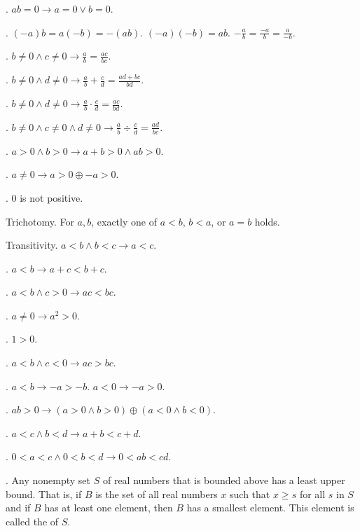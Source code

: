 \documentclass{slnotes}
\begin{document}
. \(ab = 0 \to a = 0 \lor b = 0\).

. \((-a)b = a(-b) = -(ab)\). \((-a)(-b) = ab\). \(-\frac{a}{b} = \frac{-a}{b} = \frac{a}{-b}\).

. \(b \neq 0 \land c \neq 0 \to \frac{a}{b} = \frac{ac}{bc}\).

. \(b \neq 0 \land d \neq 0 \to \frac{a}{b} + \frac{c}{d} = \frac{ad + bc}{bd}\).

. \(b \neq 0 \land d \neq 0 \to \frac{a}{b} \cdot \frac{c}{d} = \frac{ac}{bd}\).

. \(b \neq 0 \land c \neq 0 \land d \neq 0 \to \frac{a}{b} \div \frac{c}{d} = \frac{ad}{bc}\).

. \(a > 0 \land b > 0 \to a + b > 0 \land ab > 0\).

. \(a \neq 0 \to a > 0 \oplus -a > 0\).

. \(0\) is not positive.

 Trichotomy. For \(a, b\), exactly one of \(a < b\), \(b < a\), or \(a = b\) holds.

 Transitivity. \(a < b \land b < c \to a < c\).

. \(a < b \to a + c < b + c\).

. \(a < b \land c > 0 \to ac < bc\).

. \(a \neq 0 \to a^2 > 0\).

. \(1 > 0\).

. \(a < b \land c < 0 \to ac > bc\).

. \(a < b \to -a > -b\). \(a < 0 \to -a > 0\).

. \(ab > 0 \to (a > 0 \land b > 0) \oplus (a < 0 \land b < 0)\).

. \(a < c \land b < d \to a + b < c + d\).

. \(0 < a < c \land 0 < b < d \to 0 < ab < cd\).

. Any nonempty set \(S\) of real numbers that is bounded above has a least upper bound. That is, if \(B\) is the set of all real numbers \(x\) such that \(x \ge s\) for all \(s\) in \(S\) and if \(B\) has at least one element, then \(B\) has a smallest element. This element is called the  of \(S\).
\end{document}
